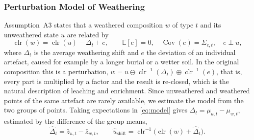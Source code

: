 \documentclass[11pt,a4paper]{article}
\newcommand{\clr}{\operatorname{clr}}
\begin{document}
\subsubsection{Perturbation Model of Weathering}
Assumption~A3 states that a weathered composition $w$ of type $t$ and its unweathered state $u$ are related by
\begin{equation}\label{eq:model}
\clr(w) = \clr(u) - \Delta_t + e, \qquad \mathbb{E}[e]=0,\quad \operatorname{Cov}(e)=\Sigma_{e,t},\quad e\perp u,
\end{equation}
where $\Delta_t$ is the average weathering shift and $e$ the deviation of an individual artefact, caused for example by a longer burial or a wetter soil.
In the original composition this is a perturbation, $w = u\ominus\clr^{-1}(\Delta_t)\oplus\clr^{-1}(e)$, that is, every part is multiplied by a factor and the result is re-closed, which is the natural description of leaching and enrichment.
Since unweathered and weathered points of the same artefact are rarely available, we estimate the model from the two groups of points.
Taking expectations in \cref{eq:model} gives $\Delta_t=\mu_{u,t}-\mu_{w,t}$, estimated by the difference of the group means,
\begin{equation}\label{eq:shift}
\hat\Delta_t = \bar z_{u,t} - \bar z_{w,t}, \qquad \hat u_{\text{shift}} = \clr^{-1}\!\big(\clr(w) + \hat\Delta_t\big).
\end{equation}
\end{document}
